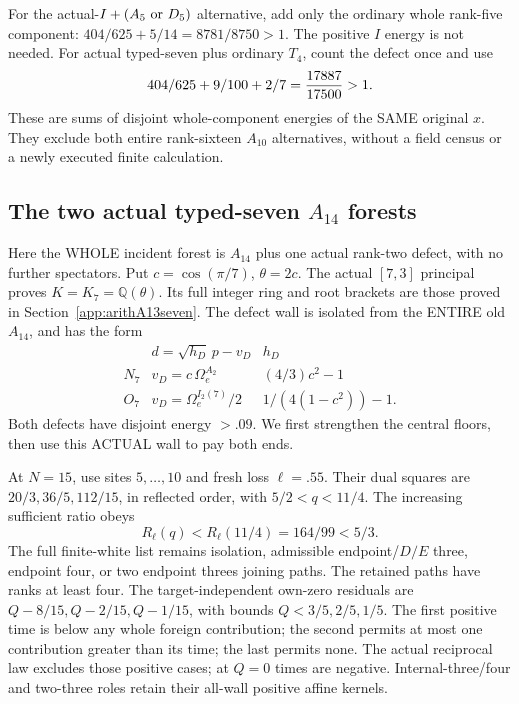 \documentclass[11pt]{article}
\begin{document}
For the actual-\(I+(A_5\hbox{ or }D_5)\)
alternative, add only the ordinary whole
rank-five component:
\(404/625+5/14=8781/8750>1\).
The positive \(I\) energy is not needed.
For actual typed-seven plus ordinary \(T_4\),
count the defect once and use
\[
                  404/625+9/100+2/7
                         ={17887\over17500}>1 .
\]
These are sums of disjoint whole-component
energies of the SAME original \(x\).
They exclude both entire rank-sixteen
\(A_{10}\) alternatives, without a field
census or a newly executed finite calculation.

\subsection{The two actual typed-seven \(A_{14}\) forests}
\label{app:arithA14typed}

Here the WHOLE incident forest is \(A_{14}\)
plus one actual rank-two defect, with no
further spectators.
Put \(c=\cos(\pi/7)\), \(\theta=2c\).
The actual \([7,3]\) principal proves
\(K=K_7=\mathbb Q(\theta)\).
Its full integer ring and root brackets
are those proved in
Section~\ref{app:arithA13seven}.
The defect wall is isolated from the ENTIRE
old \(A_{14}\), and has the form
\[
 \begin{array}{c|c|c}
 &d=\sqrt{h_D}\,p-v_D&h_D\\ \hline
 N_7&v_D=c\,\Omega_e^{A_2}&(4/3)c^2-1\\
 O_7&v_D=\Omega_e^{I_2(7)}/2&
                       1/(4(1-c^2))-1 .
 \end{array}
\]
Both defects have disjoint energy \(>.09\).
We first strengthen the central floors,
then use this ACTUAL wall to pay both ends.

At \(N=15\), use sites \(5,\ldots,10\)
and fresh loss \(\ell=.55\).
Their dual squares are \(20/3,36/5,112/15\),
in reflected order, with \(5/2<q<11/4\).
The increasing sufficient ratio obeys
\[
                R_\ell(q)<R_\ell(11/4)=164/99<5/3 .
\]
The full finite-white list remains isolation,
admissible endpoint/\(D/E\) three, endpoint
four, or two endpoint threes joining paths.
The retained paths have ranks at least four.
The target-independent own-zero residuals
are \(Q-8/15,Q-2/15,Q-1/15\), with bounds
\(Q<3/5,2/5,1/5\).
The first positive time is below any whole
foreign contribution; the second permits
at most one contribution greater than its
time; the last permits none.
The actual reciprocal law excludes those
positive cases; at \(Q=0\) times are negative.
Internal-three/four and two-three roles
retain their all-wall positive affine kernels.
\end{document}
